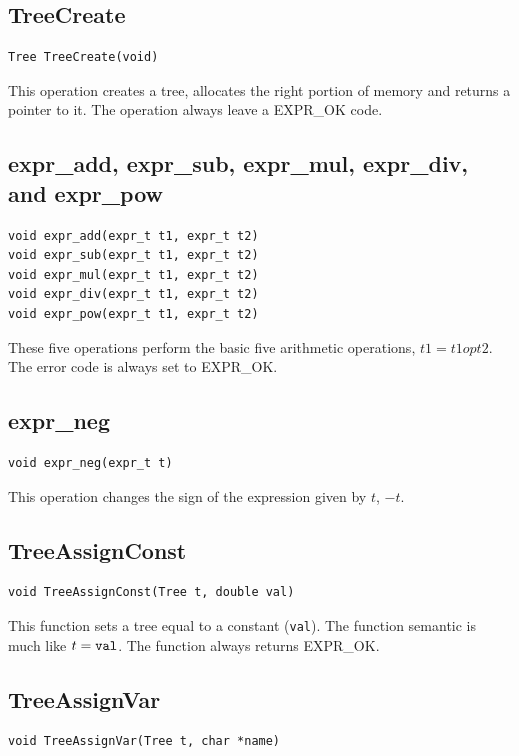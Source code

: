 \subsection{TreeCreate}
\label{treecreate}
\begin{verbatim}
Tree TreeCreate(void)
\end{verbatim}

This operation creates a tree, \ie allocates the right portion of 
memory and returns a pointer to it. The operation always leave a 
EXPR\_OK code.

\subsection{expr\_add, expr\_sub, expr\_mul, expr\_div, and expr\_pow}
\begin{verbatim}
void expr_add(expr_t t1, expr_t t2)
void expr_sub(expr_t t1, expr_t t2)
void expr_mul(expr_t t1, expr_t t2)
void expr_div(expr_t t1, expr_t t2)
void expr_pow(expr_t t1, expr_t t2)
\end{verbatim}

These five operations perform the basic five arithmetic operations, \ie 
$t1 = t1 op t2$. 
The error code is always set to EXPR\_OK.

\subsection{expr\_neg}
\begin{verbatim}
void expr_neg(expr_t t)
\end{verbatim}

This operation changes the sign of the expression given by $t$, \ie $-t$.

\subsection{TreeAssignConst}
\label{treeassign}
\begin{verbatim}
void TreeAssignConst(Tree t, double val)
\end{verbatim}

This function sets a tree equal to a constant ({\tt val}). The function
semantic is much like $t = \mbox{{\tt val}}$. The function always
returns EXPR\_OK. 

\subsection{TreeAssignVar}
\begin{verbatim}
void TreeAssignVar(Tree t, char *name)
\end{verbatim}

